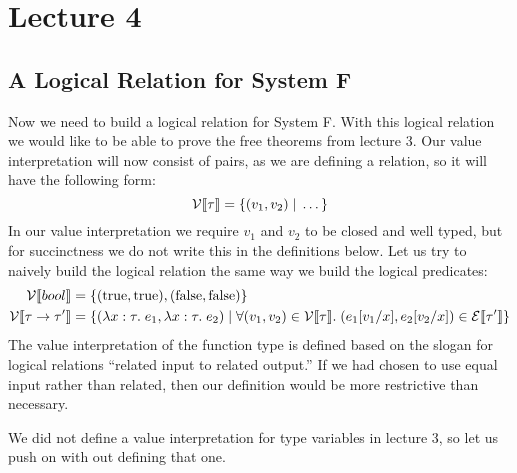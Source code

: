 \section*{Lecture 4}
\subsection*{A Logical Relation for System F}
Now we need to build a logical relation for System F. With this logical relation we would like to be able to prove the free theorems from lecture 3. Our value interpretation will now consist of pairs, as we are defining a relation, so it will have the following form:
\[
  \mathcal{V}\llbracket \tau \rrbracket = \{(v_1,v_2) \; | \; \dots \}
\]
In our value interpretation we require $v_1$ and $v_2$ to be closed and well typed, but for succinctness we do not write this in the definitions below. 
Let us try to naively build the logical relation the same way we build the logical predicates:
\begin{align*}
  \mathcal{V}\llbracket bool \rrbracket                 & = \{ (\text{true},\text{true}), (\text{false},\text{false}) \} \\
  \mathcal{V}\llbracket  \tau \rightarrow \tau' \rrbracket & = \{ (\lambda x : \tau . \; e_1,\lambda x : \tau . \; e_2) \; | \; \forall (v_1,v_2) \in \mathcal{V}\llbracket \tau \rrbracket. \; (e_1[v_1/x],e_2[v_2/x]) \in \mathcal{E}\llbracket \tau' \rrbracket \}
\end{align*}
The value interpretation of the function type is defined based on the slogan for logical relations ``related input to related output.'' If we had chosen to use equal input rather than related, then our definition would be more restrictive than necessary.

We did not define a value interpretation for type variables in lecture 3, so let us push on with out defining that one.

